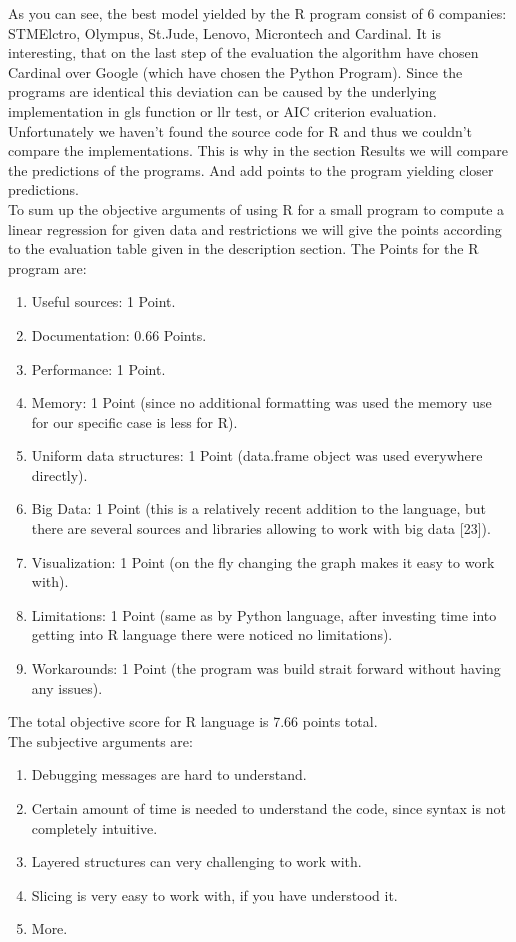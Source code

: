 \documentclass{article}
\begin{document}
As you can see, the best model yielded by the R program consist of 6 companies: STMElctro, Olympus, St.Jude, Lenovo, Microntech and Cardinal. It is interesting, that on the last step of the evaluation the algorithm have chosen Cardinal over Google (which have chosen the Python Program). Since the programs are identical this deviation can be caused by the underlying implementation in gls function or llr test, or AIC criterion evaluation. Unfortunately we haven't found the source code for R and thus we couldn't compare the implementations. This is why in the section Results we will compare the predictions of the programs. And add points to the program yielding closer predictions.\\
To sum up the objective arguments of using R for a small program to compute a linear regression for given data and restrictions we will give the points according to the evaluation table given in the description section. The Points for the R program are:
\begin{enumerate}
    \item Useful sources: 1 Point.
    \item Documentation: 0.66 Points.
    \item Performance: 1 Point.
    \item Memory: 1 Point (since no additional formatting was used the memory use for our specific case is less for R).
    \item Uniform data structures: 1 Point (data.frame object was used everywhere directly).
    \item Big Data: 1 Point (this is a relatively recent addition to the language, but there are several sources and libraries allowing to work with big data [23]).
    \item Visualization: 1 Point (on the fly changing the graph makes it easy to work with).
    \item Limitations: 1 Point (same as by Python language, after investing time into getting into R language there were noticed no limitations).
    \item Workarounds: 1 Point (the program was build strait forward without having any issues).
\end{enumerate} 
The total objective score for R language is 7.66 points total.\\
The subjective arguments are:
\begin{enumerate}
    \item Debugging messages are hard to understand.
    \item Certain amount of time is needed to understand the code, since syntax is not completely intuitive.
    \item Layered structures can very challenging to work with.
    \item Slicing is very easy to work with, if you have understood it.
    \item More.
\end{enumerate}
\end{document}
